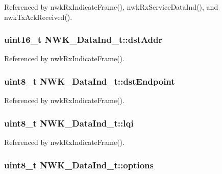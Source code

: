Referenced by nwk\-Rx\-Indicate\-Frame(), nwk\-Rx\-Service\-Data\-Ind(), and nwk\-Tx\-Ack\-Received().

\hypertarget{struct_n_w_k___data_ind__t_a5177c8f65ff641439e61e637d7fb8cd0}{
\subsubsection[{dst\-Addr}]{\setlength{\rightskip}{0pt plus 5cm}uint16\-\_\-t N\-W\-K\-\_\-\-Data\-Ind\-\_\-t\-::dst\-Addr}}\label{struct_n_w_k___data_ind__t_a5177c8f65ff641439e61e637d7fb8cd0}


Referenced by nwk\-Rx\-Indicate\-Frame().

\hypertarget{struct_n_w_k___data_ind__t_a0c390867d79e357c2d0733b4d1ab2e0e}{
\subsubsection[{dst\-Endpoint}]{\setlength{\rightskip}{0pt plus 5cm}uint8\-\_\-t N\-W\-K\-\_\-\-Data\-Ind\-\_\-t\-::dst\-Endpoint}}\label{struct_n_w_k___data_ind__t_a0c390867d79e357c2d0733b4d1ab2e0e}


Referenced by nwk\-Rx\-Indicate\-Frame().

\hypertarget{struct_n_w_k___data_ind__t_a038eb20c6ccd031895be95cc15edacea}{
\subsubsection[{lqi}]{\setlength{\rightskip}{0pt plus 5cm}uint8\-\_\-t N\-W\-K\-\_\-\-Data\-Ind\-\_\-t\-::lqi}}\label{struct_n_w_k___data_ind__t_a038eb20c6ccd031895be95cc15edacea}


Referenced by nwk\-Rx\-Indicate\-Frame().

\hypertarget{struct_n_w_k___data_ind__t_aab24e18de358fd61139a53ef6e51e286}{
\subsubsection[{options}]{\setlength{\rightskip}{0pt plus 5cm}uint8\-\_\-t N\-W\-K\-\_\-\-Data\-Ind\-\_\-t\-::options}}\label{struct_n_w_k___data_ind__t_aab24e18de358fd61139a53ef6e51e286}


